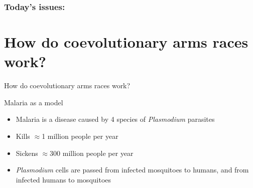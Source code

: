 {\begin{noheadline}
\begin{frame}
\begin{adjustwidth}{-2em}{-1.5em}
\begin{columns}
    \end{columns}

    \end{adjustwidth}
\end{frame}
\end{noheadline}
}

\begin{noheadline}
\begin{frame}
\frametitle{Today's issues:}
\vspace{5mm}
\tableofcontents
\end{frame}
\end{noheadline}

\section[How do coevolutionary arms races work?]{How do coevolutionary arms
    races work?}

\begin{frame}[t]
    \begin{adjustwidth}{-2em}{-1.5em}
        How do coevolutionary arms races work?

        \vspace{2mm}
        Malaria as a model

        \begin{itemize}
            \item<2-> Malaria is a disease caused by 4 species of
                \textit{Plasmodium} parasites

                \vspace{5mm}
            \item<2-> Kills $\approx$1 million people per year

                \vspace{5mm}
            \item<2-> Sickens $\approx$300 million people per year

                \vspace{5mm}
            \item<2-> \textit{Plasmodium} cells are passed from infected
                mosquitoes to humans, and from infected humans to mosquitoes
        \end{itemize}
    \end{adjustwidth}
\end{frame}

